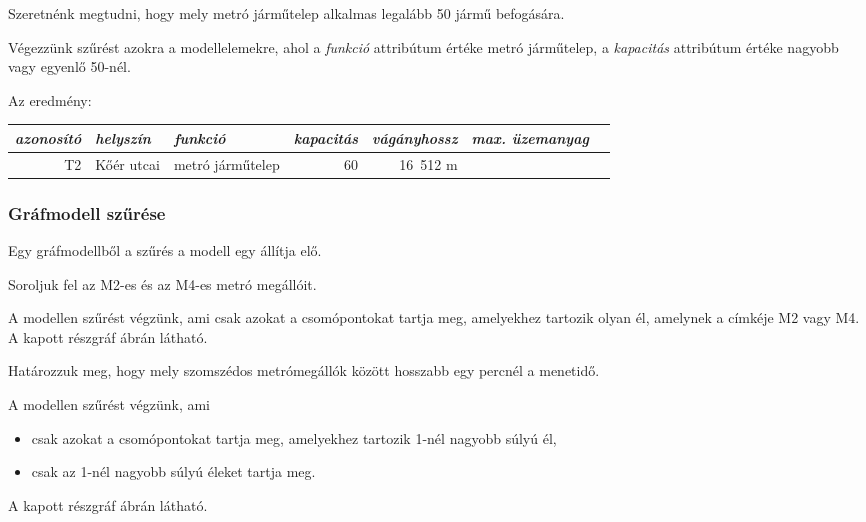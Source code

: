 \begin{pelda}
	Szeretnénk megtudni, hogy mely metró járműtelep alkalmas legalább 50 jármű befogására.
\end{pelda}

Végezzünk szűrést azokra a modellelemekre, ahol a \textit{funkció} attribútum értéke \textsf{metró járműtelep}, a \textit{kapacitás} attribútum értéke nagyobb vagy egyenlő 50-nél.

Az eredmény:
\begin{table}[H]
	\sf
	\centering
	\begin{tabular}{rllrrrr}
		\toprule
		\it azonosító & \it helyszín & \it funkció      & \it kapacitás & \it vágányhossz & \it max. üzemanyag &  \\ \midrule
		T2 & Kőér utcai   & metró járműtelep &            60 &        16~512 m &                    &  \\
		\bottomrule
	\end{tabular}
\end{table}

\subsubsection{Gráfmodell szűrése}

Egy gráfmodellből a szűrés a modell egy  állítja elő.

\begin{pelda}
	Soroljuk fel az M2-es és az M4-es metró megállóit.
\end{pelda}

A modellen szűrést végzünk, ami csak azokat a csomópontokat tartja meg, amelyekhez tartozik olyan él, amelynek a címkéje M2 vagy M4. A kapott részgráf  ábrán látható.

\begin{pelda}
	Határozzuk meg, hogy mely szomszédos metrómegállók között hosszabb egy percnél a menetidő.
\end{pelda}

A modellen szűrést végzünk, ami

\begin{itemize}
	\item csak azokat a csomópontokat tartja meg, amelyekhez tartozik 1-nél nagyobb súlyú él,
	\item csak az 1-nél nagyobb súlyú éleket tartja meg.
\end{itemize}

A kapott részgráf  ábrán látható.

